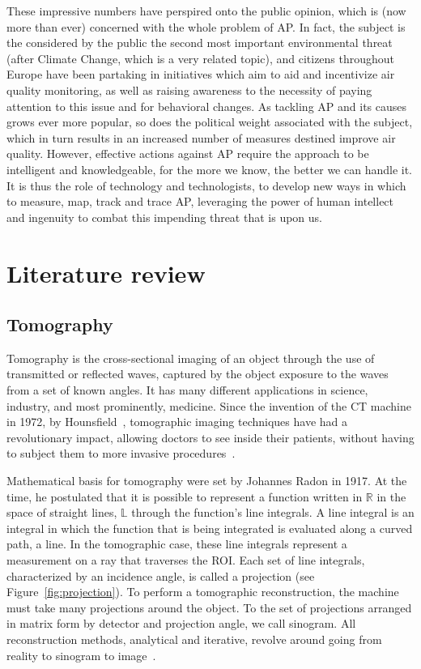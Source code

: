 These impressive numbers have perspired onto the public opinion, which
is (now more than ever) concerned with the whole problem of \gls{AP}. In
fact, the subject is the considered by the public the second most
important environmental threat (after Climate Change, which is a very
related topic), and citizens throughout Europe have been partaking in
initiatives which aim to aid and incentivize air quality monitoring, as
well as raising awareness to the necessity of paying attention to this
issue and for behavioral changes. As tackling \acrlong{AP} and its
causes grows ever more popular, so does the political weight associated
with the subject, which in turn results in an increased number of
measures destined improve air quality. However, effective actions
against \gls{AP} require the approach to be intelligent and
knowledgeable, for the more we know, the better we can handle it. It is
thus the role of technology and technologists, to develop new ways in
which to measure, map, track and trace \gls{AP}, leveraging the power of
human intellect and ingenuity to combat this impending threat that is
upon us.

\section{Literature review}%
\label{sec:literature_review}

\subsection{Tomography}%
\label{sub:tomography}

Tomography is the cross-sectional imaging of an object through the use
of transmitted or reflected waves, captured by the object exposure to
the waves from a set of known angles. It has many different applications
in science, industry, and most prominently, medicine. Since the invention
of the \gls{CT} machine in 1972, by Hounsfield~\cite{Gunderman2006},
tomographic imaging techniques have had a revolutionary impact, allowing
doctors to see inside their patients, without having to subject them to
more invasive procedures~\cite{Kak2001}.

Mathematical basis for tomography were set by Johannes Radon in 1917. At
the time, he postulated that  it is possible to represent a function
written in $\mathbb{R}$ in the space of straight lines, $\mathbb{L}$
through the function's line integrals. A line integral is an integral in
which the function that is being integrated is evaluated along a curved
path, a line. In the tomographic case, these line integrals represent a
measurement on a ray that traverses the \gls{ROI}.  Each set of line
integrals, characterized by an incidence angle, is called a projection
(see Figure~\ref{fig:projection}). To perform a tomographic
reconstruction, the machine must take many projections around the
object. To the set of projections arranged in matrix form by detector
and projection angle, we call sinogram. All reconstruction methods,
analytical and iterative, revolve around going from reality to sinogram
to image~\cite{Bruyant2002, Kak2001, Herman1973, Herman1995, Herman2009,
Defrise2003}.

